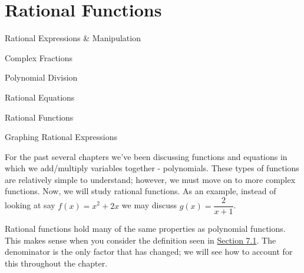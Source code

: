 \documentclass[../book.tex]{subfiles}
\begin{document}
\chapter{Rational Functions}
\begin{introduction}[Contents]
\item Rational Expressions \& Manipulation
\item Complex Fractions
\item Polynomial Division
\item Rational Equations
\item Rational Functions
\item Graphing Rational Expressions
\end{introduction}
\noindent For the past several chapters we've been discussing functions and equations in which we add/multiply variables together - polynomials. These types of functions are relatively simple to understand; however, we must move on to more complex functions. Now, we will study rational functions. As an example, instead of looking at say $f(x)=x^2+2x$ we may discuss $g(x)=\dfrac{2}{x+1}$.

Rational functions hold many of the same properties as polynomial functions.  This makes sense when you consider the definition seen in \hyperlink{section.7.1}{Section 7.1}.  The denominator is the only factor that has changed; we will see how to account for this throughout the chapter.
\end{document}
